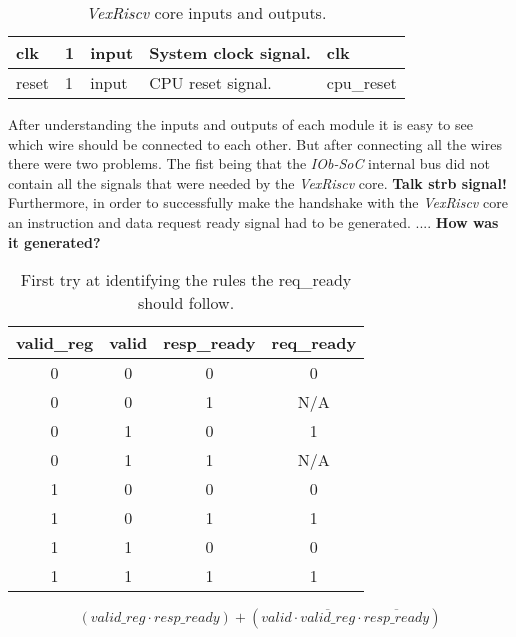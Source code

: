 \begin{table}[!ht]
{\begin{tabular}{|l|l|l|l|l|}
    clk                          & 1              & input              & System clock signal.                                                                                          & clk                             \\ \hline
    reset                        & 1              & input              & CPU reset signal.                                                                                             & cpu\_reset                      \\ \hline
    \end{tabular}%
  }
  \caption{\textit{VexRiscv} core inputs and outputs.}
  \label{tab:vexriscv_core_and_iob_soc}
\end{table}

After understanding the inputs and outputs of each module it is easy to see which wire should be connected to each other. But after connecting all the wires there were two problems. The fist being that the \textit{IOb-SoC} internal bus did not   contain all the signals that were needed by the \textit{VexRiscv} core. \textbf{Talk strb signal!} Furthermore, in order to successfully make the handshake with the \textit{VexRiscv} core an instruction and data request ready signal had to be generated. .... \textbf{How was it generated?}

\begin{table}[!h]
  \centering
  \begin{tabular}{ccc|c}
  valid\_reg & valid & resp\_ready & req\_ready \\ \hline
  0          & 0     & 0           & 0          \\
  0          & 0     & 1           & N/A        \\
  0          & 1     & 0           & 1          \\
  0          & 1     & 1           & N/A        \\
  1          & 0     & 0           & 0          \\
  1          & 0     & 1           & 1          \\
  1          & 1     & 0           & 0          \\
  1          & 1     & 1           & 1         
  \end{tabular}
  \caption{First try at identifying the rules the req\_ready should follow.}
  \label{tab:first_truth_table}
\end{table}

\begin{equation}
  (valid\_reg \cdot resp\_ready) + (valid \cdot \overline{valid\_reg} \cdot \overline{resp\_ready})
  \label{eq:first_logic_eq}
\end{equation}

